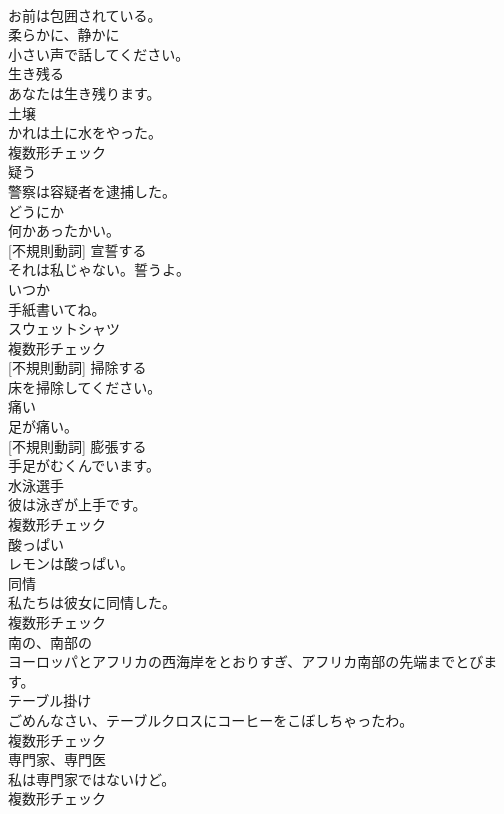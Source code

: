 \documentclass[8pt]{extreport}
\begin{document}
\begin{CJK}{UTF8}{min}
\\	お前は包囲されている。	
\\	[副詞]	柔らかに、静かに	
\\	小さい声で話してください。	
\\	[動詞]	生き残る	
\\	あなたは生き残ります。	
\\	[名詞]	土壌	
\\	かれは土に水をやった。	
\\	複数形チェック
\\	[動詞]	疑う	
\\	警察は容疑者を逮捕した。	
\\	[副詞]	どうにか	
\\	何かあったかい。	
\\	[動詞] [不規則動詞]	宣誓する	
\\	それは私じゃない。誓うよ。	
\\	[副詞]	いつか	
\\	手紙書いてね。	
\\	[名詞]	スウェットシャツ	
\\	複数形チェック
\\	[動詞] [不規則動詞]	掃除する	
\\	床を掃除してください。	
\\	[形容詞]	痛い	
\\	足が痛い。	
\\	[動詞] [不規則動詞]	膨張する	
\\	手足がむくんでいます。	
\\	[名詞]	水泳選手	
\\	彼は泳ぎが上手です。	
\\	複数形チェック
\\	[形容詞]	酸っぱい	
\\	レモンは酸っぱい。	
\\	[名詞]	同情	
\\	私たちは彼女に同情した。	
\\	複数形チェック
\\	[形容詞]	南の、南部の	
\\	ヨーロッパとアフリカの西海岸をとおりすぎ、アフリカ南部の先端までとびます。	
\\	[名詞]	テーブル掛け	
\\	ごめんなさい、テーブルクロスにコーヒーをこぼしちゃったわ。	
\\	複数形チェック
\\	[名詞]	専門家、専門医	
\\	私は専門家ではないけど。	
\\	複数形チェック

\end{CJK}
\end{document}
